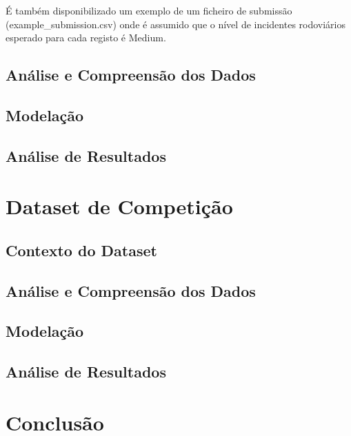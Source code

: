 \documentclass[a4paper,10pt]{article}
\begin{document}
É também disponibilizado um exemplo de um ficheiro de submissão (example_submission.csv) onde é assumido que o nível de incidentes rodoviários esperado para cada registo é Medium. 
\subsection{Análise e Compreensão dos Dados}
\subsection{Modelação}
\subsection{Análise de Resultados}
\section{Dataset de Competição}


\newpage
\subsection{Contexto do Dataset}
\subsection{Análise e Compreensão dos Dados}
\subsection{Modelação}
\subsection{Análise de Resultados}
\section{Conclusão}
\end{document}
